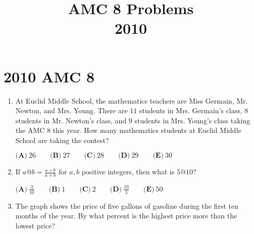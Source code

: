 \documentclass{article}
\title{AMC 8 Problems \\ 2010}
\date{}
\begin{document}
\maketitle\thispagestyle{fancy}\newpage\section*{2010 AMC 8}
\begin{enumerate}[label=\arabic*., itemsep=0.5em]
\item At Euclid Middle School, the mathematics teachers are Miss Germain, Mr. Newton, and Mrs. Young. There are \(11\) students in Mrs. Germain's class, \(8\) students in Mr. Newton's class, and \(9\) students in Mrs. Young's class taking the AMC 8 this year. How many mathematics students at Euclid Middle School are taking the contest? 

\( \textbf{(A)}\ 26 \qquad\textbf{(B)}\ 27\qquad\textbf{(C)}\ 28\qquad\textbf{(D)}\ 29\qquad\textbf{(E)}\ 30 \)\par \vspace{0.5em}\item If \(a @ b = \frac{a\times b}{a+b}\) for \(a,b\) positive integers, then what is \(5 @ 10\)? 

\(\textbf{(A)}\ \frac{3}{10} \qquad\textbf{(B)}\ 1 \qquad\textbf{(C)}\ 2 \qquad\textbf{(D)}\ \frac{10}{3} \qquad\textbf{(E)}\ 50\)\par \vspace{0.5em}\item The graph shows the price of five gallons of gasoline during the first ten months of the year. By what percent is the highest price more than the lowest price?



\end{enumerate}
\end{document}
